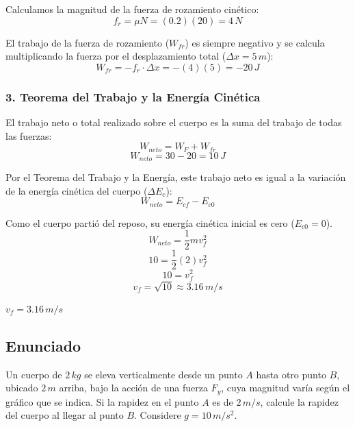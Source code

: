 \documentclass[12pt, a4paper]{article}
\begin{document}
Calculamos la magnitud de la fuerza de rozamiento cinético:
$$ f_r = \mu N = (0.2)(20) = 4 \, \si{N} $$

El trabajo de la fuerza de rozamiento ($W_{fr}$) es siempre negativo y se calcula multiplicando la fuerza por el desplazamiento total ($\Delta x = 5 \, \si{m}$):
$$ W_{fr} = -f_r \cdot \Delta x = -(4)(5) = -20 \, \si{J} $$

\subsubsection*{3. Teorema del Trabajo y la Energía Cinética}
El trabajo neto o total realizado sobre el cuerpo es la suma del trabajo de todas las fuerzas:
$$ W_{neto} = W_F + W_{fr} $$
$$ W_{neto} = 30 - 20 = 10 \, \si{J} $$

Por el Teorema del Trabajo y la Energía, este trabajo neto es igual a la variación de la energía cinética del cuerpo ($\Delta E_c$):
$$ W_{neto} = E_{cf} - E_{c0} $$

Como el cuerpo partió del reposo, su energía cinética inicial es cero ($E_{c0} = 0$).
$$ W_{neto} = \frac{1}{2} m v_f^2 $$
$$ 10 = \frac{1}{2} (2) v_f^2 $$
$$ 10 = v_f^2 $$
$$ v_f = \sqrt{10} \approx 3.16 \, \si{m/s} $$

\begin{tcolorbox}[colback=green!5!white, colframe=green!50!black, title=Respuesta Final]
\centering \Large $v_f = 3.16 \, \si{m/s}$
\end{tcolorbox}

\newpage

\subsection*{Enunciado}
Un cuerpo de $2 \, \si{kg}$ se eleva verticalmente desde un punto $A$ hasta otro punto $B$, ubicado $2 \, \si{m}$ arriba, bajo la acción de una fuerza $F_y$, cuya magnitud varía según el gráfico que se indica. Si la rapidez en el punto $A$ es de $2 \, \si{m/s}$, calcule la rapidez del cuerpo al llegar al punto $B$. Considere $g = 10 \, \si{m/s^2}$.

\begin{center}
\end{center}
\end{document}
